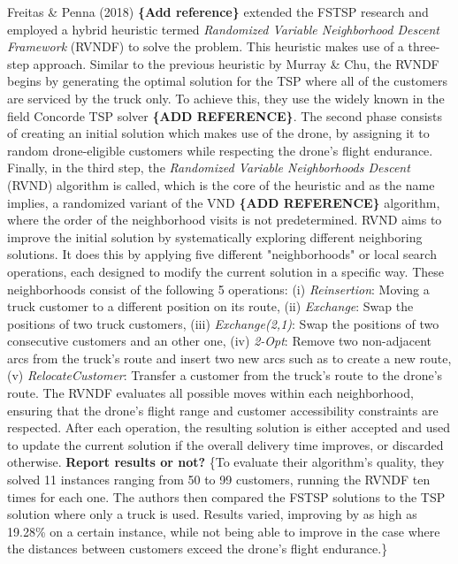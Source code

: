 \documentclass{article}
\begin{document}
	Freitas \& Penna (2018) \textbf{\{Add reference\}} extended the FSTSP research and employed a hybrid heuristic termed \textit{Randomized Variable Neighborhood Descent Framework} (RVNDF) to solve the problem. This heuristic makes use of a three-step approach. Similar to the previous heuristic by Murray \& Chu, the RVNDF begins by generating the optimal solution for the TSP where all of the customers are serviced by the truck only. To achieve this, they use the widely known in the field Concorde TSP solver \textbf{\{ADD REFERENCE\}}. The second phase consists of creating an initial solution which makes use of the drone, by assigning it to random drone-eligible customers while respecting the drone's flight endurance. Finally, in the third step, the \textit{Randomized Variable Neighborhoods Descent} (RVND) algorithm is called, which is the core of the heuristic and as the name implies, a randomized variant of the VND \textbf{\{ADD REFERENCE\}} algorithm, where the order of the neighborhood visits is not predetermined. RVND aims to improve the initial solution by systematically exploring different neighboring solutions. It does this by applying five different "neighborhoods" or local search operations, each designed to modify the current solution in a specific way. These neighborhoods consist of the following 5 operations: (i) \textit{Reinsertion}: Moving a truck customer to a different position on its route, (ii) \textit{Exchange}: Swap the positions of two truck customers, (iii) \textit{Exchange(2,1)}: Swap the positions of two consecutive customers and  an other one, (iv) \textit{2-Opt}: Remove two non-adjacent arcs from the truck's route and insert two new arcs such as to create a new route, (v) \textit{RelocateCustomer}: Transfer a customer from the truck's route to the drone's route. The RVNDF evaluates all possible moves within each neighborhood, ensuring that the drone's flight range and customer accessibility constraints are respected. After each operation, the resulting solution is either accepted and used to update the current solution if the overall delivery time improves, or discarded otherwise. \textbf{Report results or not?} \{To evaluate their algorithm's quality, they solved 11 instances ranging from 50 to 99 customers, running the RVNDF ten times for each one. The authors then compared the FSTSP solutions to the TSP solution where only a truck is used. Results varied, improving by as high as 19.28\% on a certain instance, while not being able to improve in the case where the distances between customers exceed the drone's flight endurance.\}
\end{document}
